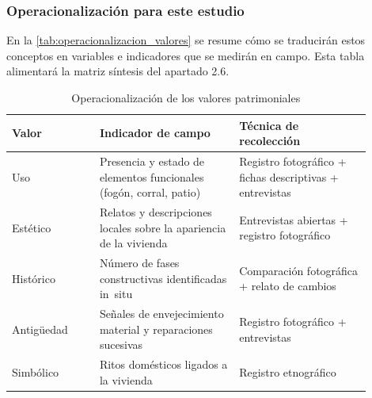 \subsubsection{Operacionalización para este estudio}

En la \autoref{tab:operacionalizacion_valores} se resume cómo se
traducirán estos conceptos en variables e indicadores que se medirán en
campo.  Esta tabla alimentará la matriz síntesis del apartado 2.6.

\begin{table}[ht]
	\centering
	\caption{Operacionalización de los valores patrimoniales}
	\vspace{0.25cm}
	\label{tab:operacionalizacion_valores}
	\begin{tabular}{@{}L{0.22\linewidth}L{0.35\linewidth}L{0.33\linewidth}@{}}
		\toprule
		\textbf{Valor}        & \textbf{Indicador de campo}                      & \textbf{Técnica de
		recolección}                                                                                  \\
		\midrule
		Uso                   & Presencia y estado de elementos funcionales (fogón, corral, patio)     & Registro fotográfico + fichas descriptivas + entrevistas                  \\
		Estético              & Relatos y descripciones locales sobre la apariencia de la vivienda     & Entrevistas abiertas + registro fotográfico                               \\
		Histórico             & Número de fases constructivas
		identificadas in~situ & Comparación fotográfica + relato de cambios                                              \\
		Antigüedad            & Señales de envejecimiento material y reparaciones sucesivas            & Registro fotográfico + entrevistas                                         \\
		Simbólico             & Ritos domésticos ligados a la vivienda           & Registro
		etnográfico                                                                                   \\
		\bottomrule
	\end{tabular}
\end{table}
